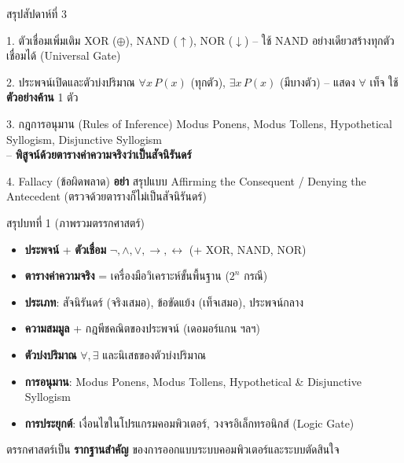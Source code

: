 \begin{frame}{สรุปสัปดาห์ที่ 3}
  \begin{exampleblock}{1. ตัวเชื่อมเพิ่มเติม}
    XOR ($\oplus$), NAND ($\uparrow$), NOR ($\downarrow$) -- ใช้ NAND อย่างเดียวสร้างทุกตัวเชื่อมได้ (Universal Gate)
  \end{exampleblock}
  \begin{exampleblock}{2. ประพจน์เปิดและตัวบ่งปริมาณ}
    $\forall x\,P(x)$ (ทุกตัว), $\exists x\,P(x)$ (มีบางตัว) -- แสดง $\forall$ เท็จ ใช้ \textbf{ตัวอย่างค้าน} 1 ตัว
  \end{exampleblock}
  \begin{exampleblock}{3. กฎการอนุมาน (Rules of Inference)}
    Modus Ponens, Modus Tollens, Hypothetical Syllogism, Disjunctive Syllogism \\
    -- \textbf{พิสูจน์ด้วยตารางค่าความจริงว่าเป็นสัจนิรันดร์}
  \end{exampleblock}
  \begin{exampleblock}{4. Fallacy (ข้อผิดพลาด)}
    \textbf{อย่า} สรุปแบบ Affirming the Consequent / Denying the Antecedent (ตรวจด้วยตารางก็ไม่เป็นสัจนิรันดร์)
  \end{exampleblock}
\end{frame}

\begin{frame}{สรุปบทที่ 1 (ภาพรวมตรรกศาสตร์)}
  \begin{itemize}
    \item \textbf{ประพจน์} + \textbf{ตัวเชื่อม} $\neg,\land,\lor,\rightarrow,\leftrightarrow$ (+ XOR, NAND, NOR)
    \item \textbf{ตารางค่าความจริง} = เครื่องมือวิเคราะห์ขั้นพื้นฐาน ($2^n$ กรณี)
    \item \textbf{ประเภท}: สัจนิรันดร์ (จริงเสมอ), ข้อขัดแย้ง (เท็จเสมอ), ประพจน์กลาง
    \item \textbf{ความสมมูล} + กฎพีชคณิตของประพจน์ (เดอมอร์แกน ฯลฯ)
    \item \textbf{ตัวบ่งปริมาณ} $\forall,\exists$ และนิเสธของตัวบ่งปริมาณ
    \item \textbf{การอนุมาน}: Modus Ponens, Modus Tollens, Hypothetical \& Disjunctive Syllogism
    \item \textbf{การประยุกต์}: เงื่อนไขในโปรแกรมคอมพิวเตอร์, วงจรอิเล็กทรอนิกส์ (Logic Gate)
  \end{itemize}
  \begin{exampleblock}{}
    \centering ตรรกศาสตร์เป็น \textbf{รากฐานสำคัญ} ของการออกแบบระบบคอมพิวเตอร์และระบบตัดสินใจ
  \end{exampleblock}
\end{frame}

